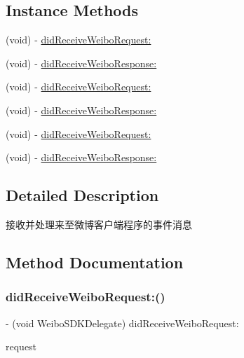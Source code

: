 \subsection*{Instance Methods}
\begin{DoxyCompactItemize}
\item 
(void) -\/ \mbox{\hyperlink{protocol_weibo_s_d_k_delegate_01-p_ab90ef15bbc631a63f2b805b8bab5089e}{did\+Receive\+Weibo\+Request\+:}}
\item 
(void) -\/ \mbox{\hyperlink{protocol_weibo_s_d_k_delegate_01-p_ab644aa5faa87eea8ff974ac274c3c595}{did\+Receive\+Weibo\+Response\+:}}
\item 
(void) -\/ \mbox{\hyperlink{protocol_weibo_s_d_k_delegate_01-p_ab90ef15bbc631a63f2b805b8bab5089e}{did\+Receive\+Weibo\+Request\+:}}
\item 
(void) -\/ \mbox{\hyperlink{protocol_weibo_s_d_k_delegate_01-p_ab644aa5faa87eea8ff974ac274c3c595}{did\+Receive\+Weibo\+Response\+:}}
\item 
(void) -\/ \mbox{\hyperlink{protocol_weibo_s_d_k_delegate_01-p_ab90ef15bbc631a63f2b805b8bab5089e}{did\+Receive\+Weibo\+Request\+:}}
\item 
(void) -\/ \mbox{\hyperlink{protocol_weibo_s_d_k_delegate_01-p_ab644aa5faa87eea8ff974ac274c3c595}{did\+Receive\+Weibo\+Response\+:}}
\end{DoxyCompactItemize}


\subsection{Detailed Description}
接收并处理来至微博客户端程序的事件消息 

\subsection{Method Documentation}
\mbox{\label{protocol_weibo_s_d_k_delegate_01-p_ab90ef15bbc631a63f2b805b8bab5089e}} 
\subsubsection{\texorpdfstring{did\+Receive\+Weibo\+Request\+:()}{didReceiveWeiboRequest:()}\hspace{0.1cm}{\footnotesize\ttfamily [1/3]}}
{\footnotesize\ttfamily -\/ (void Weibo\+S\+D\+K\+Delegate) did\+Receive\+Weibo\+Request\+: \begin{DoxyParamCaption}\item[{(\mbox{\hyperlink{interface_w_b_base_request}{W\+B\+Base\+Request}} $\ast$)}]{request }\end{DoxyParamCaption}}

